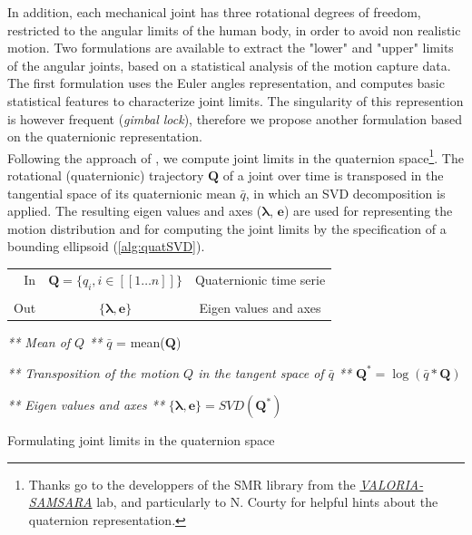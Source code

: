 In addition, each mechanical joint has three rotational degrees of freedom, restricted to the angular limits of the human body, in order to avoid non realistic motion. Two formulations are available to extract the "lower" and "upper" limits of the angular joints, based on a statistical analysis of the motion capture data.\\

The first formulation uses the Euler angles representation, and computes basic statistical features to characterize joint limits. The singularity of this represention is however frequent (\emph{gimbal lock}), therefore we propose another formulation based on the quaternionic representation.\\

Following the approach of , we compute joint limits in the quaternion space\footnote{Thanks go to the developpers of the SMR library from the \href{http://www-valoria.univ-ubs.fr/SAMSARA}{\emph{VALORIA-SAMSARA}} lab, and particularly to N. Courty for helpful hints about the quaternion representation.}. The rotational (quaternionic) trajectory $\boldsymbol{Q}$ of a joint over time is transposed in the tangential space of its quaternionic mean $\bar{q}$, in which an SVD decomposition is applied. The resulting eigen values and axes ($\boldsymbol{\lambda}$, $\boldsymbol{e}$) are used for representing the motion distribution and for computing the joint limits by the specification of a bounding ellipsoid (\myalgname \ref{alg:quatSVD}).

\begin{algorithm}
	\emph{}\;

	\begin{center}
		\begin{tabular}[3cm]{rcc}
			\multirow{1}{*}{In} & $\boldsymbol{Q} = \lbrace q_i, i \in [[1 \dots n]]\rbrace$ & Quaternionic time serie \\
			\\
			\multirow{1}{*}{Out} & $\lbrace \boldsymbol{\lambda}, \boldsymbol{e} \rbrace$ & Eigen values and axes \\
		\end{tabular}
	\end{center}
	\emph{}\;

	\emph{** Mean of $Q$ **}\;
	$\bar{q}$ = mean($\boldsymbol{Q}$)\;
 	\emph{}\;
 	
	\emph{** Transposition of the motion $Q$ in the tangent space of $\bar{q}$ **}\;
	$\boldsymbol{Q^{*}} = \log(\bar{q}*\boldsymbol{Q})$\;
	\emph{}\;

	\emph{** Eigen values and axes **}\;
	$\lbrace \boldsymbol{\lambda}, \boldsymbol{e} \rbrace = SVD(\boldsymbol{Q^{*}})$\;
	\emph{}\;

	\caption{Formulating joint limits in the quaternion space}
	\label{alg:quatSVD}
\end{algorithm}


